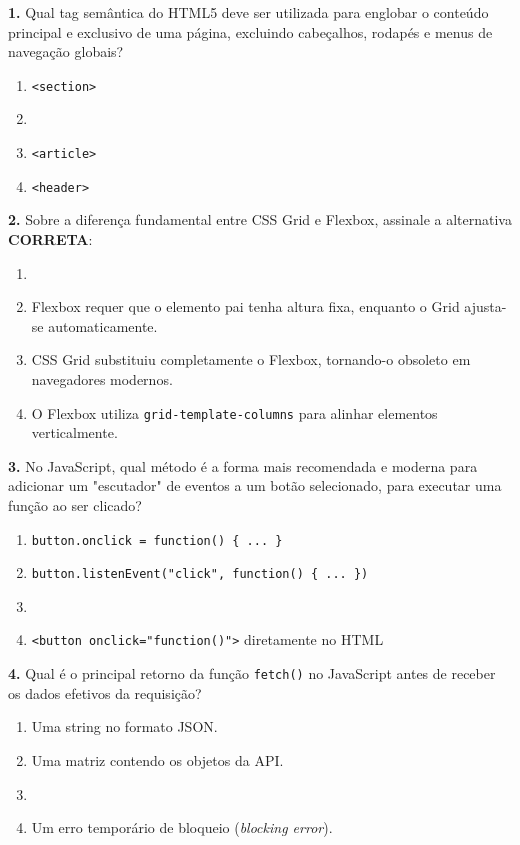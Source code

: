 \documentclass[12pt,a4paper]{article}
\newcommand{\correto}[1]{\iftoggle{gabarito}{\textcolor{corGabarito}{\textbf{#1}}}{#1}}
\begin{document}
\begin{multicols}{2}

\textbf{1.} Qual tag semântica do HTML5 deve ser utilizada para englobar o conteúdo principal e exclusivo de uma página, excluindo cabeçalhos, rodapés e menus de navegação globais?
\begin{enumerate}[label=(\alph*)]
    \item \texttt{<section>}
    \item \correto{\texttt{<main>}}
    \item \texttt{<article>}
    \item \texttt{<header>}
\end{enumerate}

\vspace{0.2cm}
\textbf{2.} Sobre a diferença fundamental entre CSS Grid e Flexbox, assinale a alternativa \textbf{CORRETA}:
\begin{enumerate}[label=(\alph*)]
    \item \correto{O CSS Grid foi projetado para layouts bidimensionais (linhas e colunas), enquanto o Flexbox foi projetado primariamente para layouts unidimensionais (uma linha ou coluna por vez).}
    \item Flexbox requer que o elemento pai tenha altura fixa, enquanto o Grid ajusta-se automaticamente.
    \item CSS Grid substituiu completamente o Flexbox, tornando-o obsoleto em navegadores modernos.
    \item O Flexbox utiliza \texttt{grid-template-columns} para alinhar elementos verticalmente.
\end{enumerate}

\vspace{0.2cm}
\textbf{3.} No JavaScript, qual método é a forma mais recomendada e moderna para adicionar um "escutador" de eventos a um botão selecionado, para executar uma função ao ser clicado?
\begin{enumerate}[label=(\alph*)]
    \item \texttt{button.onclick = function() \{ ... \}}
    \item \texttt{button.listenEvent("click", function() \{ ... \})}
    \item \correto{\texttt{button.addEventListener("click", function() \{ ... \})}}
    \item \texttt{<button onclick="function()">} diretamente no HTML
\end{enumerate}

\vspace{0.2cm}
\textbf{4.} Qual é o principal retorno da função \texttt{fetch()} no JavaScript antes de receber os dados efetivos da requisição?
\begin{enumerate}[label=(\alph*)]
    \item Uma string no formato JSON.
    \item Uma matriz contendo os objetos da API.
    \item \correto{Uma \textit{Promise} (promessa) que representará a resposta HTTP no futuro.}
    \item Um erro temporário de bloqueio (\textit{blocking error}).
\end{enumerate}


\end{multicols}
\end{document}
